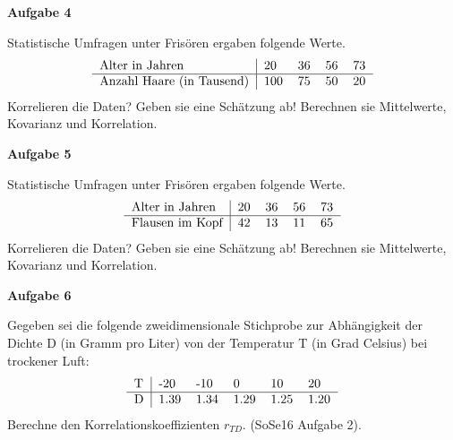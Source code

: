 \documentclass[a4paper,12pt]{article}
\newcommand{\Aufgabe}[1]{
  {
  \vspace*{0.5cm}
  \textsf{\textbf{Aufgabe #1}}
  \vspace*{0.2cm}
  
  }
}
\begin{document}
\Aufgabe{4}
Statistische Umfragen unter Frisören ergaben folgende Werte.
$$
\begin{tabular}[h]{l|llll}
Alter in Jahren & 20 & 36 & 56 & 73 \\
\hline
Anzahl Haare (in Tausend) &  100 & 75 & 50 & 20 \\
\end{tabular}
$$
Korrelieren die Daten? Geben sie eine Schätzung ab!
Berechnen sie Mittelwerte, Kovarianz und Korrelation.

\Aufgabe{5}
Statistische Umfragen unter Frisören ergaben folgende Werte.
$$
\begin{tabular}[h]{l|llll}
Alter in Jahren & 20 & 36 & 56 & 73 \\
\hline
Flausen im Kopf &  42 & 13 & 11 & 65 \\
\end{tabular}
$$
Korrelieren die Daten? Geben sie eine Schätzung ab!
Berechnen sie Mittelwerte, Kovarianz und Korrelation.




\Aufgabe{6}
Gegeben sei die folgende zweidimensionale Stichprobe zur Abhängigkeit der Dichte D (in Gramm pro Liter) von der Temperatur T (in Grad Celsius) bei trockener Luft:
$$
\begin{tabular}[h]{l|lllll}
T & -20 & -10 & 0 & 10 & 20 \\
\hline
D & 1.39 & 1.34 & 1.29 & 1.25 & 1.20 \\
\end{tabular}
$$
Berechne den Korrelationskoeffizienten $r_{TD}$.
 (SoSe16 Aufgabe 2).
 


\end{document}
